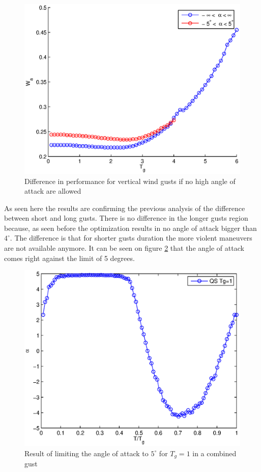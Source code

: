 \begin{figure}[h]
  \centering
 \includegraphics{./Figures/allowed_alpha_wg_tg_wt=1.eps}
  \caption{Difference in performance for vertical wind gusts if no high angle of attack are allowed}
  \label{fig:allowed_alpha_Wt_vs_tg_wt=1}
\end{figure}

\FloatBarrier

As seen here the results are confirming the previous analysis of the difference between short and long gusts.
There is no difference in the longer gusts region because, as seen before the optimization results in no angle of attack bigger than $4^{\circ}$.
The difference is that for shorter gusts duration the more violent maneuvers are not available anymore.
It can be seen on figure \ref{fig:alpha_vs_tg_maxalpha=5} that the angle of attack comes right against the limit of 5 degrees.

\begin{figure}[h]
  \centering
  \includegraphics{./Figures/alpha_vs_tg_Tg=1_wt3_maxalpha=5.eps}
  \caption{Result of limiting the angle of attack to $5^{\circ}$ for $T_g=1$ in a combined gust}
  \label{fig:alpha_vs_tg_maxalpha=5}
\end{figure}

